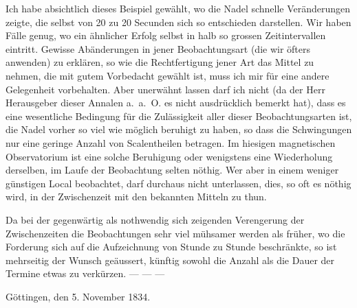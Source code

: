 \par\clearpage
{}
Ich habe absichtlich dieses Beispiel gewählt, wo die Nadel schnelle Veränderungen zeigte, die selbst von 20 zu 20 Secunden sich so entschieden darstellen. Wir haben Fälle genug, wo ein ähnlicher Erfolg selbst in halb so grossen Zeitintervallen eintritt. Gewisse Abänderungen in jener Beobachtungsart (die wir öfters anwenden) zu erklären, so wie die Rechtfertigung jener Art das Mittel zu nehmen, die mit gutem Vorbedacht gewählt ist, muss ich mir für eine andere Gelegenheit vorbehalten. Aber unerwähnt lassen darf ich nicht (da der Herr Herausgeber dieser Annalen a.\ a.\ O. es nicht ausdrücklich bemerkt hat), dass es eine wesentliche Bedingung für die Zulässigkeit aller dieser Beobachtungsarten ist, die Nadel vorher so viel wie möglich beruhigt zu haben, so dass die Schwingungen nur eine geringe Anzahl von Scalentheilen betragen. Im hiesigen magnetischen Observatorium ist eine solche Beruhigung oder wenigstens eine Wiederholung derselben, im Laufe der Beobachtung selten nöthig. Wer aber in einem weniger günstigen Local beobachtet, darf durchaus nicht unterlassen, dies, so oft es nöthig wird, in der Zwischenzeit mit den bekannten Mitteln zu thun.

Da bei der gegenwärtig als nothwendig sich zeigenden Verengerung der Zwischenzeiten die Beobachtungen sehr viel mühsamer werden als früher, wo die Forderung sich auf die Aufzeichnung von Stunde zu Stunde beschränkte, so ist mehrseitig der Wunsch geäussert, künftig sowohl die Anzahl als die Dauer der Termine etwas zu verkürzen. — — —

Göttingen, den 5. November 1834.


